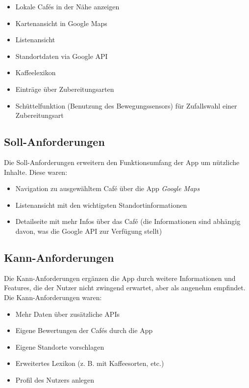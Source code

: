 \begin{itemize}
	\item Lokale Cafés in der Nähe anzeigen
	\item Kartenansicht in Google Maps
	\item Listenansicht
	\item Standortdaten via Google API
	\item Kaffeelexikon
	\item Einträge über Zubereitungsarten
	\item Schüttelfunktion (Benutzung des Bewegungssensors) für Zufallswahl einer Zubereitungsart
\end{itemize}

\subsection{Soll-Anforderungen}
Die Soll-Anforderungen erweitern den Funktionsumfang der App um nützliche Inhalte. Diese waren:

\begin{itemize}
	\item Navigation zu ausgewähltem Café über die App \emph{Google Maps}
	\item Listenansicht mit den wichtigsten Standortinformationen
	\item Detailseite mit mehr Infos über das Café (die Informationen sind abhängig davon, was die Google API zur Verfügung stellt)
\end{itemize}

\subsection{Kann-Anforderungen}
Die Kann-Anforderungen ergänzen die App durch weitere Informationen und Features, die der Nutzer nicht zwingend erwartet, aber als angenehm empfindet. Die Kann-Anforderungen waren:

\begin{itemize}
	\item Mehr Daten über zusätzliche APIs
	\item Eigene Bewertungen der Cafés durch die App
	\item Eigene Standorte vorschlagen
	\item Erweitertes Lexikon (z. B. mit Kaffeesorten, etc.)
	\item Profil des Nutzers anlegen
\end{itemize}

